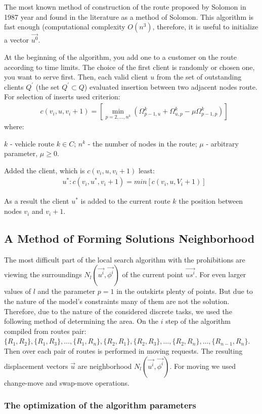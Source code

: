 \documentclass[]{TAACpaper}
\begin{document}
The most known method of construction of the route proposed by Solomon in 1987 year and found in the literature as a method of Solomon. This algorithm is fast enough (computational complexity $O(n^3)$, therefore, it is useful to initialize a vector $\vec{u^0}$.

At the beginning of the algorithm, you add one to a customer on the route according to time limits. The choice of the first client is randomly or chosen one, you want to serve first. Then, each valid client $u$ from the set of outstanding clients $Q^{'}$ (the set $Q^{'}\subset{Q}$) evaluated insertion between two adjacent nodes route. For selection of inserts used criterion:
\begin{align} 
& c(v_i,u,v_i+1)=[\min_{p=2,\dots,n^k}(\Omega_{p-1,u}^k+\Omega_{u,p}^k-\mu \Omega_{p-1,p}^k) ]
\end{align}	
where:

$k$ - vehicle route $k\in C$;
$n^k$ - the number of nodes in the route;
$\mu$ - arbitrary parameter, $\mu \ge 0 $.

Added the client, which is $c(v_i,u,v_i+1)$ least:
\begin{align} 
& u^*:c(v_i,u^*,v_i+1)=min[c(v_i,u,V_i+1)]
\end{align}	

As a result the client $u^*$ is added to the current route $k$ the position between nodes $v_i$ and $v_i+1$.

\subsection{A Method of Forming Solutions Neighborhood}
The most difficult part of the local search algorithm with the prohibitions are viewing the surroundings $N_l(\vec{u^i},\vec{\phi^i})$ of the current point $\vec{us^i}$. For even larger values of $l$ and the parameter $p=1$ in the outskirts plenty of points. But due to the nature of the model's constraints many of them are not the solution. Therefore, due to the nature of the considered discrete tasks, we used the following method of determining the area. On the $i$ step of the algorithm compiled from routes pair: $\{R_1,R_2\},\{R_1,R_3\},\dots,\{R_1,R_n\},\{R_2,R_1\}, \{R_2,R_3\},\dots,\{R_2,R_n\},\dots,\{R_{n-1},R_{n}\}$. Then over each pair of routes is performed in moving requests. The resulting displacement vectors $\vec{u}$ are neighborhood $N_l(\vec{u^i},\vec{\phi^i})$. For moving  we used change-move  and swap-move operations.


\subsubsection{The optimization of the algorithm parameters}
\end{document}
